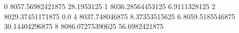 0 8057.56982421875 28.1953125
1 8036.28564453125 6.9111328125
2 8029.37451171875 0.0
4 8037.748046875 8.37353515625
6 8059.5185546875 30.14404296875
8 8086.07275390625 56.6982421875
